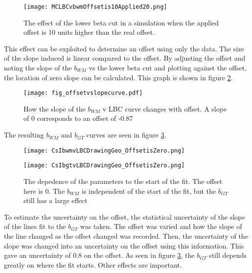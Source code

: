 \documentclass[../MaxHughesThesis.tex]{subfiles}
\begin{document}
\begin{figure}
	\centerline{\texttt{[image: MCLBCvbwmOffsetis10Applied20.png]}}
	\caption{The effect of the lower beta cut in a simulation when the applied offset is 10 units higher than the real offset.}
	\label{fig:MCoffset10applied20}
\end{figure}

This effect can be exploited to determine an offset using only the data. 
The size of the slope induced is linear compared to the offset. %
By adjusting the offset and noting the slope of the $b_{WM}$ vs the lower beta cut and plotting against the offset, the location of zero slope can be calculated.
This graph is shown in figure \ref{fig:slopevoffset}.
\begin{figure}[!htb]
	\centerline{\texttt{[image: fig\_offsetvslopecurve.pdf]}}
	\caption{How the slope of the $b_{WM}$ v LBC curve changes with offset.
		 A slope of 0 corresponds to an offset of -0.87}
	\label{fig:slopevoffset}
\end{figure}
The resulting $b_{WM}$ and $b_{GT}$ curves are seen in figure \ref{fig:offset0LBCeffect}.

\begin{figure}
    \centering
    \begin{minipage}{0.50\textwidth}
        \centerline{\texttt{[image: CsIbwmvLBCDrawingGeo\_OffsetisZero.png]}}
    \end{minipage}\hfill
    \begin{minipage}{0.50\textwidth}
        \centerline{\texttt{[image: CsIbgtvLBCDrawingGeo\_OffsetisZero.png]}}
    \end{minipage}
    \caption{The depedence of the parameters to the start of the fit.
	     The offset here is 0.
	     The $b_{WM}$ is independent of the start of the fit, but the $b_{GT}$ still has a large effect}
    \label{fig:offset0LBCeffect}
\end{figure}

To estimate the uncertainty on the offset, the statistical uncertainty of the slope of the lines fit to the $b_{GT}$  was taken.
The offset was varied and how the slope of the line changed as the offset changed was recorded.
Then, the uncertainty of the slope was changed into an uncertainty on the offset using this information.
This gave an uncertainty of 0.8 on the offset.
As seen in figure \ref{fig:offset0LBCeffect}, the $b_{GT}$ still depends greatly on where the fit starts.
Other effects are important. 
\end{document}
